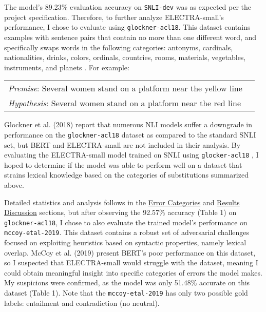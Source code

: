 \documentclass[11pt,a4paper]{article}
\begin{document}
The model's 89.23\% evaluation accuracy on \texttt{SNLI-dev} was as expected per the project specification. Therefore, to further analyze ELECTRA-small's performance, I chose to evaluate using \texttt{glockner-acl18}. This dataset contains examples with sentence pairs that contain no more than one different word, and specifically swaps words in the following categories: antonyms, cardinals, nationalities, drinks, colors, ordinals, countries, rooms, materials, vegetables, instruments, and planets \cite{DBLP:journals/corr/abs-1805-02266}. For example:

\begin{table}[hbt!]
\begin{center}
\begin{tabular}{p{} p{}}
  \textit{Premise}: Several women stand on a platform near the yellow line \\
  \textit{Hypothesis}: Several women stand on a platform near the red line
\end{tabular}
\end{center}
\end{table}

Glockner et al. (2018) report that numerous NLI models suffer a downgrade in performance on the \texttt{glockner-acl18} dataset as compared to the standard SNLI set, but BERT and ELECTRA-small are not included in their analysis. By evaluating the ELECTRA-small model trained on SNLI using \texttt{glocker-acl18} , I hoped to determine if the model was able to perform well on a dataset that strains lexical knowledge based on the categories of substitutions summarized above.

Detailed statistics and analysis follows in the \hyperref[sec:ec]{Error Categories} and \hyperref[sec:rd]{Results Discussion} sections, but after observing the 92.57\% accuracy (Table 1) on \texttt{glockner-acl18}, I chose to also evaluate the trained model's performance on \texttt{mccoy-etal-2019}. This dataset contains a robust set of adversarial challenges focused on exploiting heuristics based on syntactic properties, namely lexical overlap. McCoy et al. (2019) present BERT's poor performance on this dataset, so I suspected that ELECTRA-small would struggle with the dataset, meaning I could obtain meaningful insight into specific categories of errors the model makes. My suspicions were confirmed, as the model was only 51.48\% accurate on this dataset (Table 1). Note that the \texttt{mccoy-etal-2019} has only two possible gold labels: entailment and contradiction (no neutral).
\end{document}
